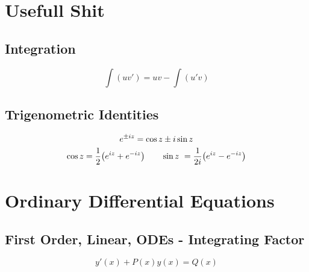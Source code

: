 \documentclass[10pt,a4paper]{article}
\renewcommand{\exp}{e^}
\newcommand{\half}{\frac{1}{2}}
\begin{document}
\begin{multicols}{2}


\section*{Usefull Shit}
\subsection*{Integration}
\[
    \int (uv') = uv - \int(u'v)
\]



\subsection*{Trigenometric Identities}
\[
    \exp{\pm i z} = \cos{z} \pm i\sin{z} \\
\]
\[
    \cos{z} = \half \qty(\exp{iz} + \exp{-iz}) \quad\quad
    \sin{z} = \frac{1}{2i}\qty(\exp{iz} - \exp{-iz})
\]



\section*{Ordinary Differential Equations}



\subsection*{First Order, Linear, ODEs - Integrating Factor}
\[
    y'(x) + P(x) y(x) = Q(x)
\]


\end{multicols}
\end{document}
